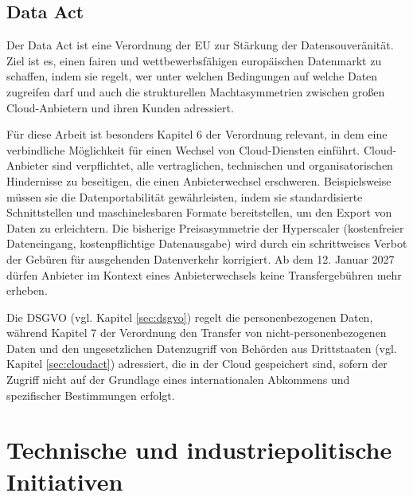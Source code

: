 \subsection{Data Act}
\label{sec:data-act}
Der Data Act \cite{dataact2023} ist eine Verordnung der \ac{EU} zur Stärkung der Datensouveränität. 
Ziel ist es, einen fairen und wettbewerbsfähigen 
europäischen Datenmarkt zu schaffen, indem sie regelt, wer unter 
welchen Bedingungen auf welche Daten zugreifen darf und auch 
die strukturellen Machtasymmetrien zwischen großen Cloud-Anbietern 
und ihren Kunden adressiert.

Für diese Arbeit ist besonders Kapitel 6 der Verordnung relevant,
in dem eine verbindliche Möglichkeit für einen Wechsel von Cloud-Diensten einführt. Cloud-Anbieter sind verpflichtet, alle 
vertraglichen, technischen und organisatorischen Hindernisse zu 
beseitigen, die einen Anbieterwechsel erschweren. Beispielsweise müssen 
sie die Datenportabilität gewährleisten, indem sie standardisierte 
Schnittstellen und maschinelesbaren Formate bereitstellen, um den Export von Daten 
zu erleichtern. Die bisherige Preisasymmetrie der 
Hyperscaler (kostenfreier Dateneingang, kostenpflichtige 
Datenausgabe) wird durch ein schrittweises Verbot der 
Gebüren für ausgehenden Datenverkehr korrigiert. Ab dem 12. Januar 2027 dürfen 
Anbieter im Kontext eines Anbieterwechsels keine 
Transfergebühren mehr erheben. 

Die \ac{DSGVO} (vgl. Kapitel \ref{sec:dsgvo}) regelt die personenbezogenen Daten, 
während Kapitel 7 der Verordnung den Transfer von 
nicht-personenbezogenen Daten und den ungesetzlichen Datenzugriff von 
Behörden aus Drittstaaten (vgl. Kapitel \ref{sec:cloudact}) adressiert, die in der Cloud gespeichert sind, sofern 
der Zugriff nicht auf der Grundlage eines internationalen Abkommens und 
spezifischer Bestimmungen erfolgt.

\section{Technische und industriepolitische Initiativen}


